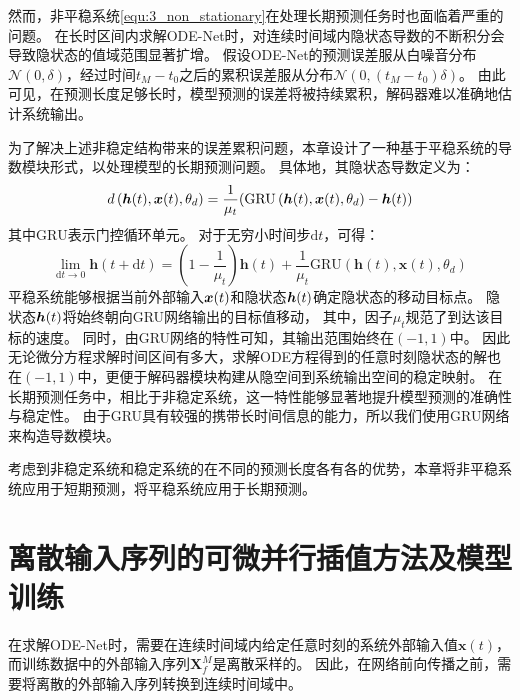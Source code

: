 然而，非平稳系统\eqref{equ:3_non_stationary}在处理长期预测任务时也面临着严重的问题。
在长时区间内求解ODE-Net时，对连续时间域内隐状态导数的不断积分会导致隐状态的值域范围显著扩增。
假设ODE-Net的预测误差服从白噪音分布$\mathcal{N}(0,\delta)$，经过时间$t_M-t_0$之后的累积误差服从分布$\mathcal{N}(0,(t_M-t_0)\delta)$。
由此可见，在预测长度足够长时，模型预测的误差将被持续累积，解码器难以准确地估计系统输出。

为了解决上述非稳定结构带来的误差累积问题，本章设计了一种基于平稳系统的导数模块形式，以处理模型的长期预测问题。
具体地，其隐状态导数定义为：
\begin{equation}
\label{equ:stationary}
d\left(\boldsymbol{h}(t), \boldsymbol{x}(t), \theta_{d}\right)=\frac{1}{\mu _t}(\text{GRU}\left(\boldsymbol{h}(t), \boldsymbol{x}(t), \theta_{d}\right)-\boldsymbol h(t))
\end{equation}
其中$\text{GRU}$表示门控循环单元。
对于无穷小时间步$\text{d}t$，可得：
\begin{equation}
    \lim_{\text{d}t \rightarrow 0}\boldsymbol{h}(t+\text{d}t) =(1-\frac{1}{\mu _t})\boldsymbol{h}(t)+\frac{1}{\mu _t}\text{GRU}\left(\boldsymbol{h}(t), \boldsymbol{x}(t), \theta_{d}\right)
\end{equation}
平稳系统能够根据当前外部输入$\boldsymbol x(t)$和隐状态$\boldsymbol h(t)$确定隐状态的移动目标点。
隐状态$\boldsymbol h (t)$将始终朝向GRU网络输出的目标值移动，
其中，因子$\mu_t$规范了到达该目标的速度。
同时，由GRU网络的特性可知，其输出范围始终在$(-1,1)$中。
因此无论微分方程求解时间区间有多大，求解ODE方程得到的任意时刻隐状态的解也在$(-1,1)$中，更便于解码器模块构建从隐空间到系统输出空间的稳定映射。
在长期预测任务中，相比于非稳定系统，这一特性能够显著地提升模型预测的准确性与稳定性。
由于GRU具有较强的携带长时间信息的能力，所以我们使用GRU网络来构造导数模块。

考虑到非稳定系统和稳定系统的在不同的预测长度各有各的优势，本章将非平稳系统应用于短期预测，将平稳系统应用于长期预测。
\section{离散输入序列的可微并行插值方法及模型训练}
\label{sec:3_interpolation_training}
在求解ODE-Net时，需要在连续时间域内给定任意时刻的系统外部输入值$\boldsymbol x(t)$，
而训练数据中的外部输入序列$\boldsymbol X_f^M$是离散采样的。
因此，在网络前向传播之前，需要将离散的外部输入序列转换到连续时间域中。

